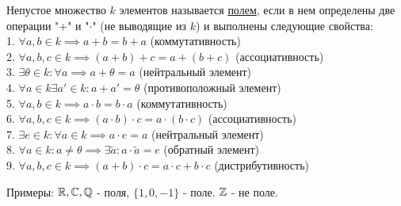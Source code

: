 \documentclass[../main.tex]{subfiles}
\begin{document}
Непустое множество $k$ элементов называется \underline{полем}, если в нем определены две операции "+" и "$\cdot$" (не выводящие из $k$) и выполнены  следующие свойства: 
\\1. $\forall a,b \in k \implies a+b=b+a$ (коммутативность)
\\2. $\forall a,b,c \in k \implies (a+b)+c=a+(b+c)$ (ассоциативность)
\\3. $\exists \theta \in k: \forall a \implies a+ \theta= a$ (нейтральный элемент)
\\4. $\forall a \in k \exists a' \in k: a+a'=\theta$ (противоположный элемент)
\\5. $\forall a,b \in k\implies a\cdot b= b\cdot a$ (коммутативность)
\\6. $\forall a,b,c \in k \implies (a\cdot b)\cdot c=a\cdot(b\cdot c)$ (ассоциативность)
\\7. $\exists e \in k: \forall a \in k \implies a\cdot e = a$ (нейтральный элемент)
\\8. $\forall a \in k: a \neq  \theta \implies \exists \tilde{a}: a\cdot \tilde{a}=e$ (обратный элемент)
\\9. $\forall a,b,c \in k \implies (a+b)\cdot c = a\cdot c + b\cdot c$ (дистрибутивность)

Примеры: $\mathbb{R}, \mathbb{C}, \mathbb{Q}$ - поля, $\{1,0,-1\}$ - поле. $\mathbb{Z}$ - не поле.
\end{document}
